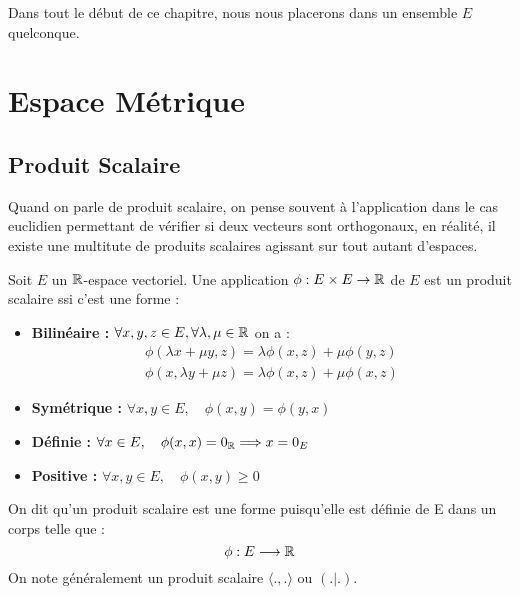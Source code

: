 
\minitoc  %

Dans tout le début de ce chapitre, nous nous placerons dans un ensemble $E$ quelconque. 


\section{Espace Métrique}


\subsection{Produit Scalaire}

Quand on parle de produit scalaire, on pense souvent à l'application dans le cas euclidien permettant de vérifier si 
deux vecteurs sont orthogonaux, en réalité, il existe une multitute de produits scalaires agissant sur tout autant d'espaces. 

\begin{definition}
    Soit $E$ un $\mathbb{R}$-espace vectoriel. Une application $\phi : E \times E \rightarrow \mathbb{R}$ de $E$ est un produit scalaire ssi c'est une forme :
    \begin{itemize}
        \item \textbf{Bilinéaire :} $ \forall x,y,z \in E, \forall \lambda,\mu \in \mathbb{R}$ on a :
            \begin{align}
                \phi(\lambda x + \mu y,z) = \lambda \phi(x,z) + \mu \phi(y,z) \\ 
                \phi(x,\lambda y + \mu z) = \lambda \phi(x,z) + \mu \phi(x,z)
            \end{align}
        \item \textbf{Symétrique :} $ \forall x,y \in E, \quad \phi(x,y) = \phi(y,x)$ 
        \item \textbf{Définie :} $ \forall x \in E, \quad \phi(x,x) = 0_{\mathbb{R}} \Longrightarrow x = 0_E $
        \item \textbf{Positive :} $ \forall x,y \in E, \quad \phi(x,y) \geq 0 $
    \end{itemize}
    On dit qu'un produit scalaire est une forme puisqu'elle est définie de E dans un corps telle que : 
        \[ \phi : E \longrightarrow \mathbb{R} \] 
    On note généralement un produit scalaire $ \langle .,. \rangle$ ou $(.|.)$. 
\end{definition}


